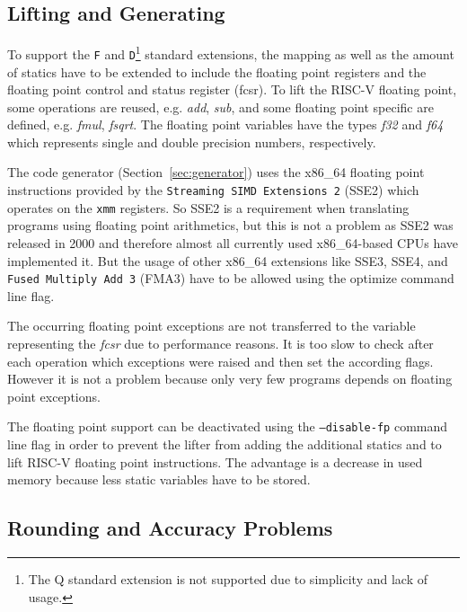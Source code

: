 \documentclass[course=eragp]{aspdoc}
\begin{document}
\subsection{Lifting and Generating}

To support the \texttt{F} and \texttt{D}\footnote{The Q standard extension is not supported due to simplicity and lack of usage.}
standard extensions, the mapping as well as the amount of statics have to be extended to include the
floating point registers and the floating point control and status register (fcsr). To lift the
RISC-V floating point, some operations are reused, e.g. \emph{add}, \emph{sub}, and some floating
point specific are defined, e.g. \emph{fmul}, \emph{fsqrt}. The floating point variables have the
types \emph{f32} and \emph{f64} which represents single and double precision numbers, respectively.

\par

The code generator (Section~\ref{sec:generator}) uses the x86\_64 floating point instructions provided by the
\texttt{Streaming SIMD Extensions 2} (SSE2) which operates on the \texttt{xmm} registers. So SSE2 is
a requirement when translating programs using floating point arithmetics, but this is not a problem
as SSE2 was released in 2000 and therefore almost all currently used x86\_64-based CPUs have
implemented it. But the usage of other x86\_64 extensions like SSE3, SSE4, and \texttt{Fused Multiply
    Add 3} (FMA3) have to be allowed using the optimize command line flag.

\par

The occurring floating point exceptions are not transferred to the variable representing the
\emph{fcsr} due to performance reasons. It is too slow to check after each operation which
exceptions were raised and then set the according flags. However it is not a problem because only
very few programs depends on floating point exceptions.

\par

The floating point support can be deactivated using the \texttt{--disable-fp} command line flag in order
to prevent the lifter from adding the additional statics and to lift RISC-V floating point
instructions. The advantage is a decrease in used memory because less static variables have to be
stored.

\subsection{Rounding and Accuracy Problems}
\end{document}

